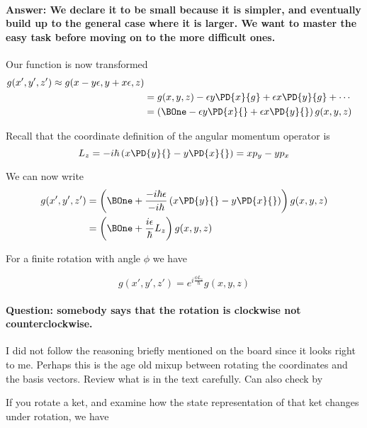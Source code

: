 \paragraph{Answer: We declare it to be small because it is simpler, and eventually build up to the general case where it is larger.  We want to master the easy task before moving on to the more difficult ones.}

Our function is now transformed
\begin{align*}
g(x', y', z') \approx g( x - y \epsilon, y + x \epsilon, z) \\
&=
g( x , y , z) - \epsilon y \PD{x}{g} + \epsilon x \PD{y}{g} + \cdots \\
&=
\left( \BOne
- \epsilon y \PD{x}{}
+ \epsilon x \PD{y}{}
\right)
g( x, y ,z )
\end{align*}

Recall that the coordinate definition of the angular momentum operator is
\begin{equation}\label{eqn:PHY356FDec7:120}
L_z = -i \hbar \left( x \PD{y}{} - y \PD{x}{} \right) = x p_y - y p_x
\end{equation}

We can now write
\begin{align*}
g(x', y', z')
&=
\left( \BOne
+
\frac{-i \hbar \epsilon}{-i\hbar} \left(
x \PD{y}{}
- y \PD{x}{}
\right)
\right)
g( x, y ,z ) \\
&=
\left( \BOne +
\frac{i \epsilon}{\hbar} L_z
\right)
g( x, y ,z )
\end{align*}

For a finite rotation with angle $\phi$ we have

\begin{equation}\label{eqn:PHY356FDec7:130}
g(x', y', z')
=
e^{i \frac{\phi L_z}{\hbar}}
g( x, y ,z )
\end{equation}

\paragraph{Question: somebody says that the rotation is clockwise not counterclockwise.}

I did not follow the reasoning briefly mentioned on the board since it looks right to me.  Perhaps this is the age old mixup between rotating the coordinates and the basis vectors.  Review what is in the text carefully.  Can also check by

If you rotate a ket, and examine how the state representation of that ket changes under rotation, we have

